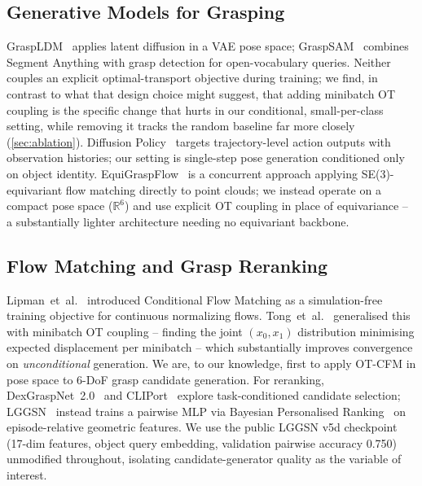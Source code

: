 \documentclass[journal]{IEEEtran}
\begin{document}
\subsection{Generative Models for Grasping}

GraspLDM~\cite{barad2023graspldm} applies latent diffusion in a VAE pose
space; GraspSAM~\cite{noh2024graspsam} combines Segment Anything with grasp
detection for open-vocabulary queries. Neither couples an explicit
optimal-transport objective during training; we find, in contrast to what
that design choice might suggest, that adding minibatch OT coupling is the
specific change that hurts in our conditional, small-per-class setting,
while removing it tracks the random baseline far more closely
(\cref{sec:ablation}). Diffusion Policy~\cite{chi2023diffusion} targets
trajectory-level action outputs with observation histories; our setting is
single-step pose generation conditioned only on object identity.
EquiGraspFlow~\cite{lim2025equigraspflow} is a concurrent approach applying
SE(3)-equivariant flow matching directly to point clouds; we instead operate
on a compact pose space ($\mathbb{R}^6$) and use explicit OT coupling in
place of equivariance -- a substantially lighter architecture needing no
equivariant backbone.

\subsection{Flow Matching and Grasp Reranking}

Lipman~et~al.~\cite{lipman2022cfm} introduced Conditional Flow Matching as a
simulation-free training objective for continuous normalizing flows.
Tong~et~al.~\cite{tong2023otcfm} generalised this with minibatch OT
coupling -- finding the joint $(x_0,x_1)$ distribution minimising expected
displacement per minibatch -- which substantially improves convergence on
\emph{unconditional} generation. We are, to our knowledge, first to apply
OT-CFM in pose space to 6-DoF grasp candidate generation. For reranking,
DexGraspNet~2.0~\cite{fang2024dexgraspnet2} and
CLIPort~\cite{shridhar2022cliport} explore task-conditioned candidate
selection; LGGSN~\cite{owg2024} instead trains a pairwise MLP via Bayesian
Personalised Ranking~\cite{rendle2009bpr} on episode-relative geometric
features. We use the public LGGSN v5d checkpoint (17-dim features, object
query embedding, validation pairwise accuracy 0.750) unmodified throughout,
isolating candidate-generator quality as the variable of interest.

\end{document}
